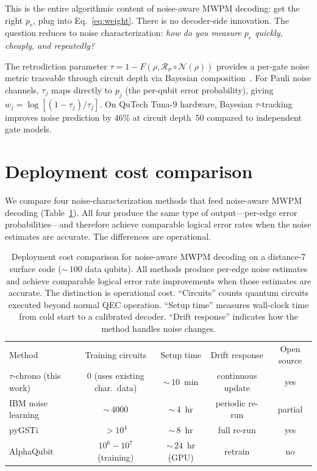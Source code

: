 \documentclass[prl,twocolumn,superscriptaddress,longbibliography]{revtex4-2}
\newcommand{\Petz}{\mathcal{R}}
\newcommand{\chan}{\mathcal{N}}
\begin{document}
This is the entire algorithmic content of noise-aware MWPM decoding: get the right $p_e$, plug into Eq.~\eqref{eq:weight}. There is no decoder-side innovation. The question reduces to noise characterization: \emph{how do you measure $p_e$ quickly, cheaply, and repeatedly?}

The retrodiction parameter $\tau = 1 - F(\rho, \Petz_\sigma \circ \chan(\rho))$ provides a per-gate noise metric traceable through circuit depth via Bayesian composition~\cite{Huang2026Paper1}. For Pauli noise channels, $\tau_j$ maps directly to $p_j$ (the per-qubit error probability), giving $w_j = \log[(1-\tau_j)/\tau_j]$. On QuTech Tuna-9 hardware, Bayesian $\tau$-tracking improves noise prediction by 46\% at circuit depth~50 compared to independent gate models.

\section{Deployment cost comparison}

We compare four noise-characterization methods that feed noise-aware MWPM decoding (Table~\ref{tab:cost}). All four produce the same type of output---per-edge error probabilities---and therefore achieve comparable logical error rates when the noise estimates are accurate. The differences are operational.

\begin{table}[t]
\caption{\label{tab:cost}Deployment cost comparison for noise-aware MWPM decoding on a distance-7 surface code (${\sim}\,100$ data qubits). All methods produce per-edge noise estimates and achieve comparable logical error rate improvements when those estimates are accurate. The distinction is operational cost. ``Circuits'' counts quantum circuits executed beyond normal QEC operation. ``Setup time'' measures wall-clock time from cold start to a calibrated decoder. ``Drift response'' indicates how the method handles noise changes.}
\begin{ruledtabular}
\begin{tabular}{lcccc}
Method & Training circuits & Setup time & Drift response & Open source \\
\colrule
$\tau$-chrono (this work) & 0 (uses existing char.\ data) & ${\sim}\,10$~min & continuous update & yes \\
IBM noise learning~\cite{vandenBerg2023,Kim2023} & ${\sim}\,4000$ & ${\sim}\,4$~hr & periodic re-run & partial \\
pyGSTi~\cite{Nielsen2021} & $>10^4$ & ${\sim}\,8$~hr & full re-run & yes \\
AlphaQubit~\cite{AlphaQubit2024} & $10^6{-}10^7$ (training) & ${\sim}\,24$~hr (GPU) & retrain & no \\
\end{tabular}
\end{ruledtabular}
\end{table}
\end{document}
